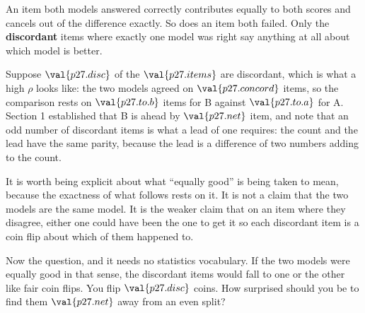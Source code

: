 \begin{fr}

An item both models answered correctly contributes equally to both scores and
cancels out of the difference exactly. So does an item both failed. Only the
\textbf{discordant} items \dash{} where exactly one model was right \dash{}
say anything at all about which model is better.

Suppose $\val{p27.disc}$ of the $\val{p27.items}$ are discordant, which is
what a high $\rho$ looks like: the two models agreed on
$\val{p27.concord}$ items, so the comparison rests on
$\val{p27.to.b}$ items for B against $\val{p27.to.a}$ for A. Section 1
established that B is ahead by $\val{p27.net}$ item, and note that an odd
number of discordant items is what a lead of one requires: the count and the
lead have the same parity, because the lead is a difference of two numbers
adding to the count.

It is worth being explicit about what \enquote{equally good} is being taken
to mean, because the exactness of what follows rests on it. It is not a claim
that the two models are the same model. It is the weaker claim that on an item
where they disagree, either one could have been the one to get it \dash{} so
each discordant item is a coin flip about which of them happened to.

Now the question, and it needs no statistics vocabulary. If the two models
were equally good in that sense, the discordant items would fall to one or the
other like fair coin flips. You flip $\val{p27.disc}$ coins. How surprised
should you be to find them $\val{p27.net}$ away from an even split?
\dotline
\nextframe
\end{fr}

